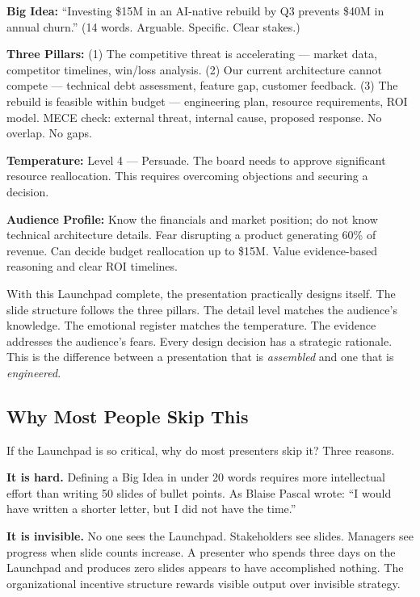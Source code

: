\textbf{Big Idea:} ``Investing \$15M in an AI-native rebuild by Q3 prevents \$40M in annual churn.'' (14 words. Arguable. Specific. Clear stakes.)

\textbf{Three Pillars:} (1) The competitive threat is accelerating --- market data, competitor timelines, win/loss analysis. (2) Our current architecture cannot compete --- technical debt assessment, feature gap, customer feedback. (3) The rebuild is feasible within budget --- engineering plan, resource requirements, ROI model. MECE check: external threat, internal cause, proposed response. No overlap. No gaps.

\textbf{Temperature:} Level 4 --- Persuade. The board needs to approve significant resource reallocation. This requires overcoming objections and securing a decision.

\textbf{Audience Profile:} Know the financials and market position; do not know technical architecture details. Fear disrupting a product generating 60\% of revenue. Can decide budget reallocation up to \$15M. Value evidence-based reasoning and clear ROI timelines.

\begin{insightbox}
With this Launchpad complete, the presentation practically designs itself. The slide structure follows the three pillars. The detail level matches the audience's knowledge. The emotional register matches the temperature. The evidence addresses the audience's fears. Every design decision has a strategic rationale. This is the difference between a presentation that is \emph{assembled} and one that is \emph{engineered}.
\end{insightbox}

\subsection{Why Most People Skip This}

If the Launchpad is so critical, why do most presenters skip it? Three reasons.

\textbf{It is hard.} Defining a Big Idea in under 20 words requires more intellectual effort than writing 50 slides of bullet points. As Blaise Pascal wrote: ``I would have written a shorter letter, but I did not have the time.''

\textbf{It is invisible.} No one sees the Launchpad. Stakeholders see slides. Managers see progress when slide counts increase. A presenter who spends three days on the Launchpad and produces zero slides appears to have accomplished nothing. The organizational incentive structure rewards visible output over invisible strategy.

